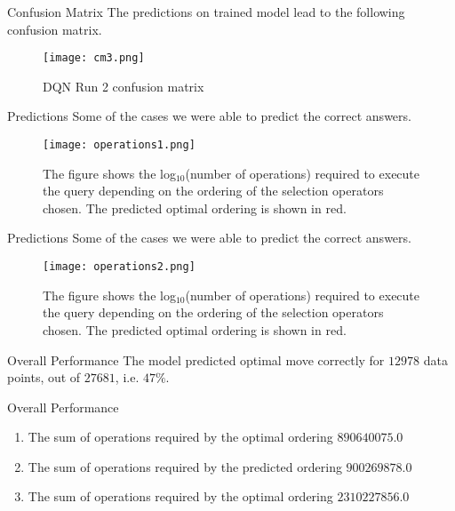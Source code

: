 \begin{frame}{Confusion Matrix}
    The predictions on trained model lead to the following confusion matrix.
    \begin{figure}
        \centering
        \texttt{[image: cm3.png]}\\
        \caption{DQN Run 2 confusion matrix}
        \label{fig:dqn_r2_1}
    \end{figure}
\end{frame}

\begin{frame}{Predictions}
    Some of the cases we were able to predict the correct answers.
    \begin{figure}
        \centering
        \texttt{[image: operations1.png]}\\
        \caption{The figure shows the log$_{10}$(number of operations) required to execute the query depending on the ordering of the selection operators chosen. The predicted optimal ordering is shown in red.}
        \label{fig:operations1}
    \end{figure}
\end{frame}

\begin{frame}{Predictions}
    Some of the cases we were able to predict the correct answers.
    \begin{figure}
        \centering
        \texttt{[image: operations2.png]}\\
        \caption{The figure shows the log$_{10}$(number of operations) required to execute the query depending on the ordering of the selection operators chosen. The predicted optimal ordering is shown in red.}
        \label{fig:operations2}
    \end{figure}
\end{frame}

\begin{frame}{Overall Performance}
    The model predicted optimal move correctly for $12978$ data points, out of $27681$, i.e. $47\%$.\\
\end{frame}

\begin{frame}{Overall Performance}
    \begin{enumerate}[<+->]
        \item The sum of operations required by the optimal ordering $890640075.0$
        \item The sum of operations required by the predicted ordering $900269878.0$
        \item The sum of operations required by the optimal ordering $2310227856.0$
    \end{enumerate}
\end{frame}

